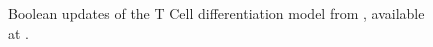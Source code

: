 \begin{figure}[t]
	\caption{Boolean updates of the T Cell differentiation model from \cite{puniya2018mechanistic}, available at \cite{ModelCellCollective}.}
	\label{fig:boolean-formulas}
\end{figure}

